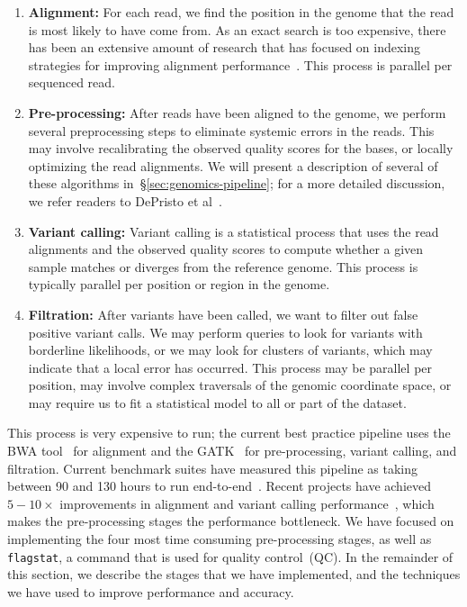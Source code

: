 \documentclass{acm_proc_article-sp}
\begin{document}
\begin{enumerate}
\item \textbf{Alignment:} For each read, we find the position in the genome that the read is most likely to
have come from. As an exact search is too expensive, there has been an extensive amount of research
that has focused on indexing strategies for improving alignment performance~\cite{li10, li11,
zaharia11}. This process is parallel per sequenced read.
\item \textbf{Pre-processing:} After reads have been aligned to the genome, we perform several
preprocessing steps to eliminate systemic errors in the reads. This may involve recalibrating the
observed quality scores for the bases, or locally optimizing the read alignments. We will present a
description of several of these algorithms in~\S\ref{sec:genomics-pipeline}; for a more detailed
discussion, we refer readers to DePristo et al~\cite{depristo11}.
\item \textbf{Variant calling:} Variant calling is a statistical process that uses the read alignments
and the observed quality scores to compute whether a given sample \linebreak matches or diverges
from the reference genome. This process is typically parallel per position or region in the genome.
\item \textbf{Filtration:} After variants have been called, we want to filter out false positive variant calls.
We may perform queries to look for variants with borderline likelihoods, or we may look for clusters of
variants, which may indicate that a local error has occurred. This process may be parallel per position,
may involve complex traversals of the genomic coordinate space, or may require us to fit a statistical
model to all or part of the dataset.
\end{enumerate}

This process is very expensive to run; the current best practice pipeline uses the BWA tool~\cite{li10} for
alignment and the GATK~\cite{mckenna10, depristo11} for pre-processing, variant calling, and filtration.
Current benchmark suites have measured this pipeline as taking between 90 and 130 hours to run
end-to-end~\cite{talwalkar14}. Recent projects have achieved $5-10\times$ improvements in alignment
and variant calling performance~\cite{zaharia11, rimmer14}, which makes the pre-processing stages
the performance bottleneck. We have focused on implementing the four most time consuming
pre-processing stages, as well as \texttt{flagstat}, a command that is used for quality control~(QC). In
the remainder of this section, we describe the stages that we have implemented, and the techniques
we have used to improve performance and accuracy.
\end{document}
